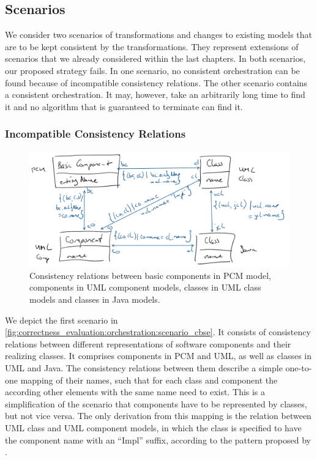 \subsection{Scenarios}

We consider two scenarios of transformations and changes to existing models that are to be kept consistent by the transformations.
They represent extensions of scenarios that we already considered within the last chapters.
In both scenarios, our proposed strategy fails.
In one scenario, no consistent orchestration can be found because of incompatible consistency relations.
The other scenario contains a consistent orchestration. It may, however, take an arbitrarily long time to find it and no algorithm that is guaranteed to terminate can find it.


\subsubsection*{Incompatible Consistency Relations}

\begin{figure}
    \centering
    \includegraphics[width=\textwidth]{figures/correctness/evaluation/orchestration_scenario_cbse.png}
    \caption[Example scenario with incompatibility]{Consistency relations between basic components in \gls{PCM} model, components in \gls{UML} component models, classes in \gls{UML} class models and classes in Java models.}
    \label{fig:correctness_evaluation:orchestration:scenario_cbse}
\end{figure}

We depict the first scenario in \autoref{fig:correctness_evaluation:orchestration:scenario_cbse}.
It consists of consistency relations between different representations of software components and their realizing classes.
It comprises components in \gls{PCM} and \gls{UML}, as well as classes in \gls{UML} and Java.
The consistency relations between them describe a simple one-to-one mapping of their names, such that for each class and component the according other elements with the same name need to exist.
This is a simplification of the scenario that components have to be represented by classes, but not vice versa.
The only derivation from this mapping is the relation between \gls{UML} class and \gls{UML} component models, in which the class is specified to have the component name with an \enquote{Impl} suffix, according to the pattern proposed by \textcite{langhammer2017a}.

